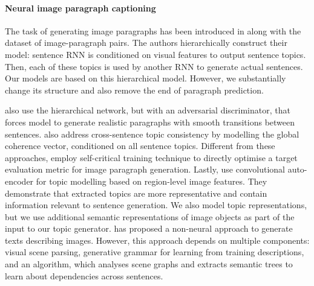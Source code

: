 \documentclass[11pt,a4paper]{article}
\begin{document}
\fi



\paragraph{Neural image paragraph captioning}
The task of generating image paragraphs has been introduced in \cite{krause2016hierarchical} along with the dataset of image-paragraph pairs.
The authors hierarchically construct their model: sentence RNN is conditioned on visual features to output sentence topics.
Then, each of these topics is used by another RNN to generate actual sentences.
Our models are based on this hierarchical model.
However, we substantially change its structure and also remove the end of paragraph prediction.


 also use the hierarchical network, but with an adversarial discriminator, that forces model to generate realistic paragraphs with smooth transitions between sentences.
 also address cross-sentence topic consistency by modelling the global coherence vector, conditioned on all sentence topics.
Different from these approaches,  employ self-critical training technique \cite{selfcritical2016} to directly optimise a target evaluation metric for image paragraph generation.
Lastly,  use convolutional auto-encoder for topic modelling based on region-level image features.
They demonstrate that extracted topics are more representative and contain information relevant to sentence generation.
We also model topic representations, but we use additional semantic representations of image objects as part of the input to our topic generator.
 has proposed a non-neural approach to generate texts describing images.
However, this approach %
depends on multiple components: visual scene parsing, generative grammar for learning from training descriptions, and an algorithm, which analyses scene graphs and extracts semantic trees to learn about dependencies across sentences.
\end{document}
